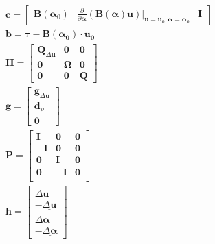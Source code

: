 \begin{equation}
  \label{eq:qpsimple1}
  \begin{aligned}
    & \bm{c}=
    \begin{bmatrix}
      \bm{B}\left(\bm{\alpha}_0 \right)  
      & \frac{\partial}{\partial \bm{\alpha}} \left( \bm{B}(\bm{\alpha})
      \bm{u} \right) |_{\bm{u}=\bm{u}_{0}, \bm{\alpha}=\bm{\alpha}_{0}}
      & \bm{I}
    \end{bmatrix} \\
    & \bm{b}=
    \bm{\tau}-  \bm{B} ( \bm{\alpha_0} ) \cdot \bm{u_0} \\
    & \bm{H}=
    \begin{bmatrix}
      \bm{Q}_{\Delta \bm{u}} & \bm{0} & \bm{0} \\
      \bm{0} & \bm{\Omega} & \bm{0} \\
      \bm{0} & \bm{0} & \bm{Q}
    \end{bmatrix} \\
    & \bm{g}=
    \begin{bmatrix}
       \bm{g}_{\Delta \bm{u}} \\
       \bm{d}_{\rho} \\
       \bm{0}
    \end{bmatrix} \\
    & \bm{P}=
    \begin{bmatrix}
       \bm{I} & \bm{0} & \bm{0} \\
       \bm{-I} & \bm{0} & \bm{0} \\
       \bm{0} & \bm{I} & \bm{0} \\
       \bm{0} & \bm{-I} & \bm{0} \\
    \end{bmatrix} \\
    & \bm{h}=
    \begin{bmatrix}
       \overline{\Delta \bm{u}} \\
       -\underline{\Delta \bm{u}}  \\
       \overline{\Delta \bm{\alpha}} \\
       -\underline{\Delta \bm{\alpha}}
    \end{bmatrix}
  \end{aligned}
\end{equation}

